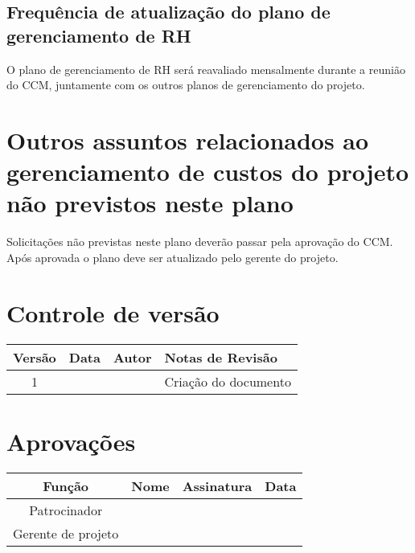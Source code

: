 \subsection{Frequência de atualização do plano de gerenciamento de RH}

O plano de gerenciamento de RH será reavaliado mensalmente durante a reunião do CCM, juntamente com os outros planos de gerenciamento do projeto.

\section{Outros assuntos relacionados ao gerenciamento de custos do projeto não previstos neste plano}

Solicitações não previstas neste plano deverão passar pela aprovação do CCM. Após aprovada o plano deve ser atualizado pelo gerente do projeto.

\section{Controle de versão}

\begin{table}[H]
	\begin{tabularx}{\textwidth}{| c | c | X | X |}
		\hline
		\textbf{Versão} & \textbf{Data} & \textbf{Autor}      & \textbf{Notas de Revisão} \\
		\hline
		1                &               & \projectManagerName{} & Criação do documento     \\
		\hline
	\end{tabularx}
	\centering
\end{table}

\section{Aprovações}

\begin{table}[H]
	\begin{tabularx}{\textwidth}{| c | c | X | c |}
		\hline
		\textbf{Função}  & \textbf{Nome}       & \textbf{Assinatura}      & \textbf{Data} \\
		\hline
		Patrocinador       & \projectSponsorName{} & \projectSponsorSignature{} &               \\
		\hline
		Gerente de projeto & \projectManagerName{} & \projectManagerSignature{} &               \\
		\hline
	\end{tabularx}
	\centering
\end{table}